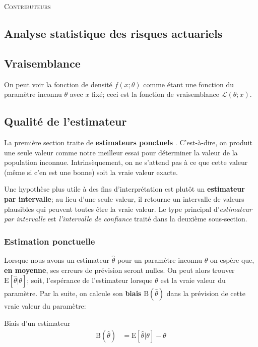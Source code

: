 \documentclass[10pt, french]{article}
\begin{document}
\begin{center}
	\textsc{\Large Contributeurs}\\[0.5cm] 
\end{center}


\newpage

\begin{multicols*}{2}

\section*{Analyse statistique des risques actuariels}

\subsection*{Vraisemblance}

On peut voir la fonction de densité $f(x; \theta)$ comme étant une fonction du paramètre inconnu $\theta$ avec $x$ fixé; ceci est la fonction de vraisemblance $\mathcal{L}(\theta; x)$.

\subsection*{Qualité de l'estimateur}

La première section traite de \guillemotleft \textbf{estimateurs ponctuels} \guillemotright. 
C'est-à-dire, on produit une seule valeur comme notre meilleur essai pour déterminer la valeur de la population inconnue.
Intrinsèquement, on ne s'attend pas à ce que cette valeur (même si c'en est une bonne) soit la vraie valeur exacte.

Une hypothèse plus utile à des fins d'interprétation est plutôt un \textbf{estimateur par intervalle}; au lieu d'une seule valeur, il retourne un intervalle de valeurs plausibles qui peuvent toutes être la vraie valeur. 
Le type principal d'\textit{estimateur par intervalle} est \textit{l'intervalle de confiance} traité dans la deuxième sous-section.

\subsubsection*{Estimation ponctuelle}

Lorsque nous avons un estimateur $\hat\theta$ pour un paramètre inconnu $\theta$ on espère que, \textbf{en moyenne}, ses erreurs de prévision seront nulles. 
On peut alors trouver $\text{E}[\hat\theta | \theta]$; soit, l'espérance de l'estimateur lorsque $\theta$ est la vraie valeur du paramètre.
Par la suite, on calcule son \textbf{biais} $\text{B}(\hat\theta)$ dans la prévision de cette vraie valeur du paramètre:
\begin{algo}{Biais d'un estimateur}
\begin{align*}
	\text{B}(\hat\theta) 
	&= 	\text{E}[\hat\theta | \theta] - \theta
\end{align*}
\end{algo}


\end{multicols*}
\end{document}
